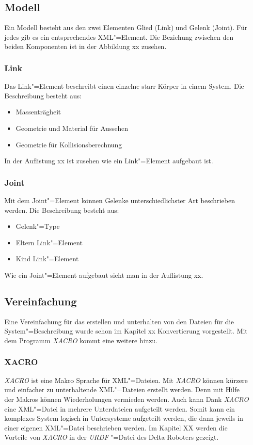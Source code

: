 \subsection{Modell}
Ein Modell besteht aus den zwei Elementen Glied (Link) und Gelenk (Joint).
Für jedes gib es ein entsprechendes XML"=Element.
Die Beziehung zwischen den beiden Komponenten ist in der Abbildung xx zusehen. %


\subsubsection*{Link}
Das Link"=Element beschreibt einen einzelne starr Körper in einem System.
Die Beschreibung besteht aus:
\begin{itemize}
\item Massenträgheit
\item Geometrie und Material für Aussehen
\item Geometrie für Kollisionsberechnung
\end{itemize}
In der Auflistung xx ist zusehen wie ein Link"=Element aufgebaut ist. %

\subsubsection*{Joint}
Mit dem Joint"=Element können Gelenke unterschiedlichster Art beschrieben werden.
Die Beschreibung besteht aus:
\begin{itemize}
\item Gelenk"=Type
\item Eltern Link"=Element
\item Kind Link"=Element
\end{itemize}
Wie ein Joint"=Element aufgebaut sieht man in der Auflistung xx. %


\subsection{Vereinfachung}
Eine Vereinfachung für das erstellen und unterhalten von den Dateien für die System"=Beschreibung wurde schon im Kapitel xx Konvertierung vorgestellt. %
Mit dem Programm \textit{XACRO} kommt eine weitere hinzu. 

\subsubsection{XACRO}
\textit{XACRO} ist eine Makro Sprache für XML"=Dateien. %
Mit \textit{XACRO} können kürzere und einfacher zu unterhaltende XML"=Dateien erstellt werden.
Denn mit Hilfe der Makros können Wiederholungen vermieden werden.
Auch kann Dank \textit{XACRO} eine XML"=Datei in mehrere Unterdateien aufgeteilt werden.
Somit kann ein komplexes System logisch in Untersysteme aufgeteilt werden, die dann jeweils in einer eigenen XML"=Datei beschrieben werden. 
Im Kapitel XX werden die Vorteile von \textit{XACRO} in der \textit{URDF} "=Datei des Delta-Roboters gezeigt.

